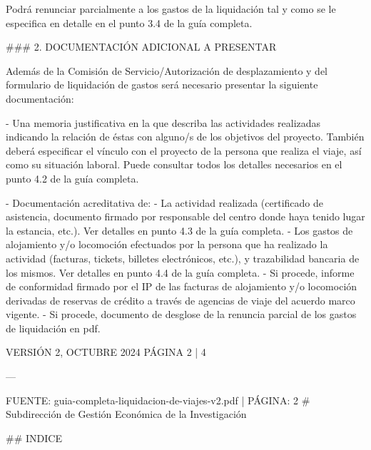 \documentclass{article}
\begin{document}
\begin{itemize}
\begin{itemize}
\begin{scriptsize}
                  Podrá renunciar parcialmente a los gastos de la liquidación tal y como se le especifica en detalle en el punto 3.4 de la guía completa.

                  \#\#\# 2. DOCUMENTACIÓN ADICIONAL A PRESENTAR

                  Además de la Comisión de Servicio/Autorización de desplazamiento y del formulario de liquidación de gastos será necesario presentar la siguiente documentación:

                  - Una memoria justificativa en la que describa las actividades realizadas indicando la relación de éstas con alguno/s de los objetivos del proyecto. También deberá especificar el vínculo con el proyecto de la persona que realiza el viaje, así como su situación laboral. Puede consultar todos los detalles necesarios en el punto 4.2 de la guía completa.

                  - Documentación acreditativa de:
                  - La actividad realizada (certificado de asistencia, documento firmado por responsable del centro donde haya tenido lugar la estancia, etc.). Ver detalles en punto 4.3 de la guía completa.
                  - Los gastos de alojamiento y/o locomoción efectuados por la persona que ha realizado la actividad (facturas, tickets, billetes electrónicos, etc.), y trazabilidad bancaria de los mismos. Ver detalles en punto 4.4 de la guía completa.
                  - Si procede, informe de conformidad firmado por el IP de las facturas de alojamiento y/o locomoción derivadas de reservas de crédito a través de agencias de viaje del acuerdo marco vigente.
                  - Si procede, documento de desglose de la renuncia parcial de los gastos de liquidación en pdf.

                  VERSIÓN 2, OCTUBRE 2024    PÁGINA 2 | 4

                  ---

                  FUENTE: guia-completa-liquidacion-de-viajes-v2.pdf | PÁGINA: 2
                  \# Subdirección de Gestión Económica de la Investigación

                  \#\# INDICE


\end{scriptsize}
\end{itemize}
\end{itemize}
\end{document}
